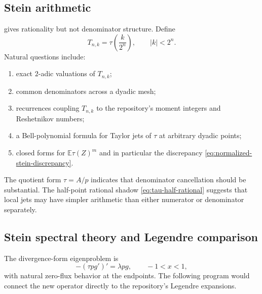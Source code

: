 \documentclass[11pt,oneside]{article}
\theoremstyle{definition}
\theoremstyle{remark}
\newcommand{\E}{\mathbb E}
\begin{document}
\subsection{Stein arithmetic}
 gives rationality but not denominator structure.  Define
\[
 T_{n,k}=\tau\!\left(\frac{k}{2^n}\right),
 \qquad |k|<2^n.
\]
Natural questions include:

\begin{enumerate}
\item exact $2$-adic valuations of $T_{n,k}$;
\item common denominators across a dyadic mesh;
\item recurrences coupling $T_{n,k}$ to the repository's moment integers and
Reshetnikov numbers;
\item a Bell-polynomial formula for Taylor jets of $\tau$ at arbitrary dyadic
points;
\item closed forms for $\E\tau(Z)^m$ and in particular the discrepancy
\eqref{eq:normalized-stein-discrepancy}.
\end{enumerate}

The quotient form $\tau=A/p$ indicates that denominator cancellation should be
substantial.  The half-point rational shadow \eqref{eq:tau-half-rational} suggests
that local jets may have simpler arithmetic than either numerator or denominator
separately.

\subsection{Stein spectral theory and Legendre comparison}
The divergence-form eigenproblem is
\begin{equation}\label{eq:sturm-liouville}
 -(\tau p g')'=\lambda p g,
 \qquad -1<x<1,
\end{equation}
with natural zero-flux behavior at the endpoints.  The following program would
connect the new operator directly to the repository's Legendre expansions.
\end{document}
